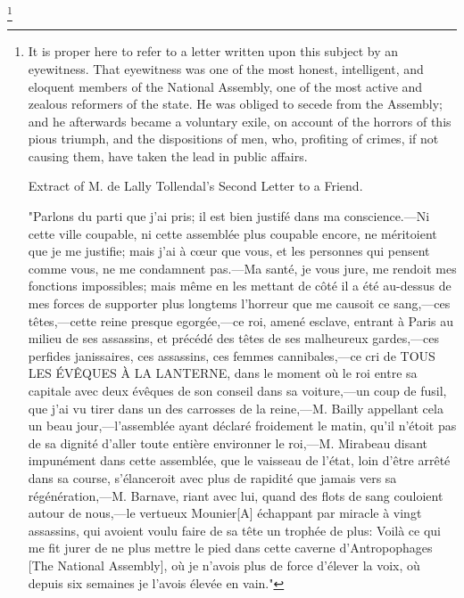 \footnote{ It is proper here to refer to a letter written upon this subject by an eyewitness. That eyewitness was one of the most honest, intelligent, and eloquent members of the National Assembly, one of the most active and zealous reformers of the state. He was obliged to secede from the Assembly; and he afterwards became a voluntary exile, on account of the horrors of this pious triumph, and the dispositions of men, who, profiting of crimes, if not causing them, have taken the lead in public affairs.

Extract of M. de Lally Tollendal's Second Letter to a Friend.

"Parlons du parti que j'ai pris; il est bien justifé dans ma conscience.—Ni cette ville coupable, ni cette assemblée plus coupable encore, ne méritoient que je me justifie; mais j'ai à cœur que vous, et les personnes qui pensent comme vous, ne me condamnent pas.—Ma santé, je vous jure, me rendoit mes fonctions impossibles; mais même en les mettant de côté il a été au-dessus de mes forces de supporter plus longtems l'horreur que me causoit ce sang,—ces têtes,—cette reine presque egorgée,—ce roi, amené esclave, entrant à Paris au milieu de ses assassins, et précédé des têtes de ses malheureux gardes,—ces perfides janissaires, ces assassins, ces femmes cannibales,—ce cri de TOUS LES ÉVÊQUES À LA LANTERNE, dans le moment où le roi entre sa capitale avec deux évêques de son conseil dans sa voiture,—un coup de fusil, que j'ai vu tirer dans un des carrosses de la reine,—M. Bailly appellant cela un beau jour,—l'assemblée ayant déclaré froidement le matin, qu'il n'étoit pas de sa dignité d'aller toute entière environner le roi,—M. Mirabeau disant impunément dans cette assemblée, que le vaisseau de l'état, loin d'être arrêté dans sa course, s'élanceroit avec plus de rapidité que jamais vers sa régénération,—M. Barnave, riant avec lui, quand des flots de sang couloient autour de nous,—le vertueux Mounier[A] échappant par miracle à vingt assassins, qui avoient voulu faire de sa tête un trophée de plus: Voilà ce qui me fit jurer de ne plus mettre le pied dans cette caverne d'Antropophages [The National Assembly], où je n'avois plus de force d'élever la voix, où depuis six semaines je l'avois élevée en vain."

}
